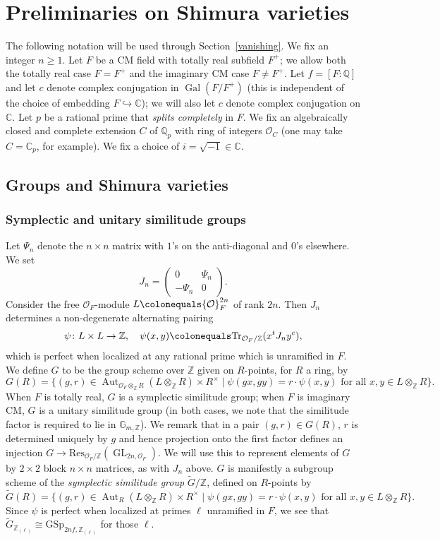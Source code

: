 \documentclass{amsart}
\theoremstyle{remark}
\numberwithin{equation}{subsection}
\def\C{\CC}
\newcommand{\Q}{\QQ}
\newcommand{\Z}{\ZZ}
\newcommand{\CC}{{\mathbb C}}
\newcommand{\GG}{{\mathbb G}}
\newcommand{\QQ}{{\mathbb Q}}
\newcommand{\ZZ}{{\mathbb Z}}
\newcommand{\cO}{{\mathcal O}}
\DeclareMathOperator{\Aut}{Aut}
\DeclareMathOperator{\Gal}{Gal}
\DeclareMathOperator{\GL}{GL}
\newcommand{\tG}{\widetilde{G}}
\newcommand{\defeq}{\colonequals}
\newcommand{\tensor}{\otimes}
\renewcommand{\(}{\left(}
\renewcommand{\)}{\right)}
\begin{document}
\section{Preliminaries on Shimura varieties}
\label{recollections}
The following notation will be used through Section~\ref{vanishing}. 
We fix an integer $n\geq 1$. Let $F$ be a CM field with totally real subfield $F^+$; we allow both the totally real case $F=F^+$ and the imaginary CM case $F\neq F^+$. Let $f = [F:\QQ]$ and let $c$ denote complex conjugation in $\Gal(F/F^+)$ (this is independent of the choice of embedding $F \hookrightarrow \C$); we will also let $c$ denote complex conjugation on $\C$.
Let $p$ be a rational prime that \emph{splits completely} in $F$.  We fix an algebraically closed and complete extension $C$ of $\Q_p$ with ring of integers $\cO_C$ (one may take $C = \C_p$, for example). We fix a choice of $i=\sqrt{-1}\in \C$.

\subsection{Groups and Shimura varieties}\label{3.1}
\subsubsection{Symplectic and unitary similitude groups}\label{subsect:unitary_group} Let $\Psi_n$ denote the $n \times n$ matrix with $1$'s on the anti-diagonal and $0$'s elsewhere. We set
\[
J_n = \begin{pmatrix}
0 & \Psi_n \\ -\Psi_n & 0
\end{pmatrix}.
\]
Consider the free $\cO_F$-module $L \defeq \cO_F^{2n}$ of rank $2n$.
Then $J_n$ determines a non-degenerate alternating pairing
\[
  \psi \colon L \times L \rightarrow \Z,\quad \psi(x,y) \defeq \mathrm{Tr}_{\cO_F/\Z}(x^t J_n y^c),
\]
which is perfect when localized at any rational prime which is unramified in $F$. We define $G$ to be the group scheme over $\Z$ given on $R$-points, for $R$ a ring, by
\[
G(R) = \{ (g,r) \in \Aut_{\cO_F\otimes_{\Z}R}( L \tensor_\Z R) \times R^\times \mid \psi(gx,gy)=r \cdot \psi(x,y) \text{ for all $x,y \in L \tensor_\Z R$} \}.
\]
When $F$ is totally real, $G$ is a symplectic similitude group; when $F$ is imaginary CM, $G$ is a unitary similitude group (in both cases, we note that the similitude factor is required to lie in $\GG_{m,\Z}$). We remark that in a pair $(g,r)\in G(R)$, $r$ is determined uniquely by $g$ and hence projection onto the first factor defines an injection $G \to \mathrm{Res}_{\cO_F/\Z}(\GL_{2n,\cO_F})$. We will use this to represent elements of $G$ by $2 \times 2$ block $n\times n$ matrices, as with $J_n$ above. $G$ is manifestly a subgroup scheme of the \emph{symplectic similitude group} $\tG/\Z$, defined on $R$-points by 
\[
\tG(R) = \{ (g,r) \in \Aut_{R}( L \tensor_\Z R) \times R^\times \mid \psi(gx,gy)=r \cdot \psi(x,y) \text{ for all $x,y \in L \tensor_\Z R$} \}.
\]
Since $\psi$ is perfect when localized at primes $\ell$ unramified in $F$, we see that $\tG_{\Z_{(\ell)}} \cong \mathrm{GSp}_{2nf, \Z_{(\ell)}}$ for those $\ell$. 
\end{document}
